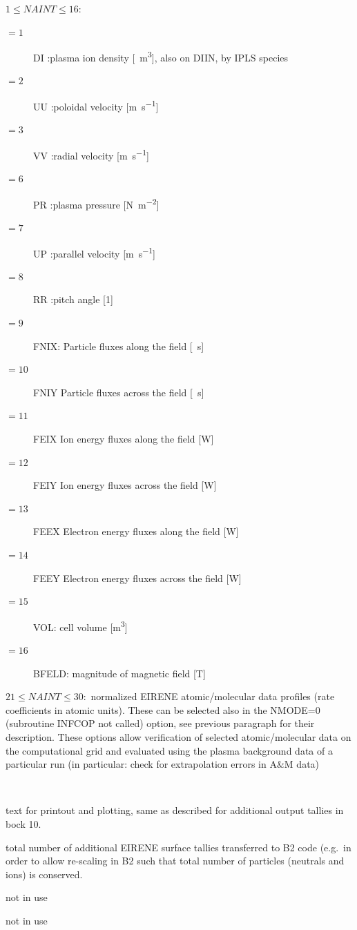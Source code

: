 \begin{description}
        $1 \le NAINT \le 16 :$
        \begin{description}
          \item[$= 1$] DI :plasma ion density
                  [\si{\per\cubic\metre}], also on DIIN, by IPLS species
          \item[$= 2$] UU
                :poloidal velocity [\si{\metre\per\second}]
          \item[$= 3$] VV :radial velocity
                  [\si{\metre\per\second}]
          \item[$= 6$] PR :plasma pressure
                  [\si{\newton\per\square\metre}]
          \item[$= 7$] UP :parallel velocity
                  [\si{\metre\per\second}]
          \item[$= 8$] RR :pitch angle [\num{1}]
          \item[$= 9$]
                FNIX: Particle fluxes along the field [\si{\per\second}]
          \item[$= 10$] FNIY
                Particle fluxes across the field [\si{\per\second}]
          \item[$= 11$] FEIX Ion
                energy fluxes along the field [\si{\watt}]
          \item[$= 12$] FEIY Ion energy fluxes
                across the field [\si{\watt}]
          \item[$= 13$] FEEX Electron energy fluxes along
                the field [\si{\watt}]
          \item[$= 14$] FEEY Electron energy fluxes across the
                field [\si{\watt}]
          \item[$= 15$] VOL: cell volume [\si{\cubic\metre}]
          \item[$=
                  16$] BFELD: magnitude of magnetic field [\si{\tesla}]
        \end{description}

        $21 \le NAINT \le 30 :$ normalized EIRENE atomic/molecular data profiles (rate
        coefficients in atomic units).
        These can be selected also in the NMODE=0 (subroutine INFCOP not called)
        option, see previous paragraph for their description.
        These options allow verification of selected atomic/molecular data on the
        computational grid and evaluated using the plasma background data of a
        particular run (in particular: check for extrapolation errors in A$\&$M data)

  \item[TXTPLS, TXTPSP, TXTPUN] ~

        text for printout and plotting, same as described for additional output tallies
        in bock 10.
  \item[NAOTB] total number of additional EIRENE surface tallies transferred to
        B2 code (e.g.\ in order to allow re-scaling in B2 such that total number of
        particles (neutrals and ions) is conserved.
  \item[NAOTS] not in use
  \item[NAOTT] not in use
\end{description}

